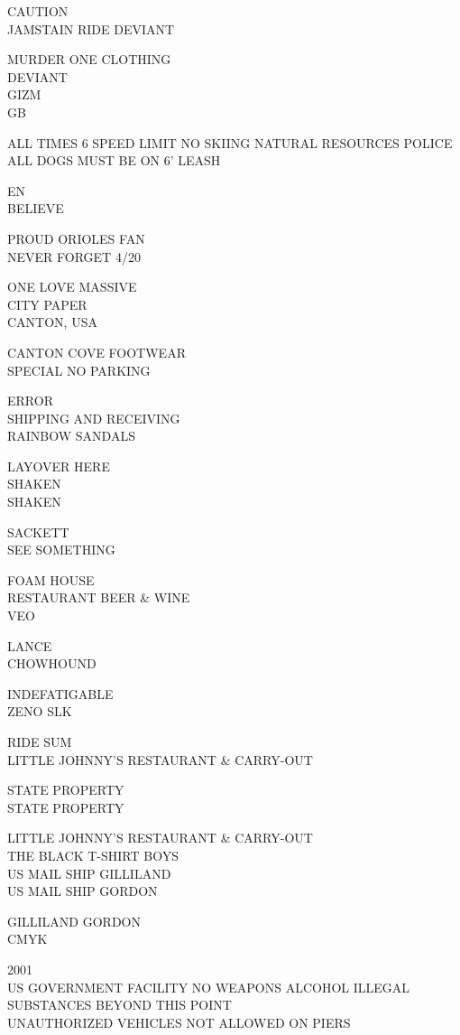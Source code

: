\documentclass[10pt,letterpaper]{article}
\begin{document}
CAUTION\\
JAMSTAIN RIDE DEVIANT

MURDER ONE CLOTHING\\
DEVIANT\\
GIZM\\
GB

ALL TIMES 6 SPEED LIMIT NO SKIING NATURAL RESOURCES POLICE\\
ALL DOGS MUST BE ON 6' LEASH

EN\\
BELIEVE

PROUD ORIOLES FAN\\
NEVER FORGET 4/20

ONE LOVE MASSIVE\\
CITY PAPER\\
CANTON, USA

CANTON COVE FOOTWEAR\\
SPECIAL NO PARKING

ERROR\\
SHIPPING AND RECEIVING\\
RAINBOW SANDALS

LAYOVER HERE\\
SHAKEN\\
SHAKEN

SACKETT\\
SEE SOMETHING

FOAM HOUSE\\
RESTAURANT BEER \& WINE\\
VEO

LANCE\\
CHOWHOUND

INDEFATIGABLE\\
ZENO SLK

RIDE SUM\\
LITTLE JOHNNY'S RESTAURANT \& CARRY{-}OUT

STATE PROPERTY\\
STATE PROPERTY

LITTLE JOHNNY'S RESTAURANT \& CARRY{-}OUT\\
THE BLACK T{-}SHIRT BOYS\\
US MAIL SHIP GILLILAND\\
US MAIL SHIP GORDON

GILLILAND GORDON\\
CMYK

2001\\
US GOVERNMENT FACILITY NO WEAPONS ALCOHOL ILLEGAL SUBSTANCES BEYOND THIS POINT\\
UNAUTHORIZED VEHICLES NOT ALLOWED ON PIERS
\end{document}
